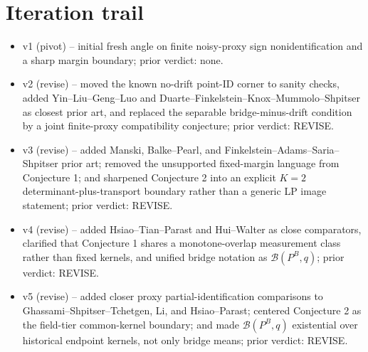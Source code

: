 \documentclass[11pt]{article}
\theoremstyle{definition}
\theoremstyle{plain}
\theoremstyle{remark}
\begin{document}
\section{Iteration trail}
\begin{itemize}[leftmargin=*]
\item v1 (pivot) -- initial fresh angle on finite noisy-proxy sign nonidentification and a sharp margin boundary; prior verdict: none.
\item v2 (revise) -- moved the known no-drift point-ID corner to sanity checks, added Yin--Liu--Geng--Luo and Duarte--Finkelstein--Knox--Mummolo--Shpitser as closest prior art, and replaced the separable bridge-minus-drift condition by a joint finite-proxy compatibility conjecture; prior verdict: REVISE.
\item v3 (revise) -- added Manski, Balke--Pearl, and Finkelstein--Adams--Saria--Shpitser prior art; removed the unsupported fixed-margin language from Conjecture 1; and sharpened Conjecture 2 into an explicit \(K=2\) determinant-plus-transport boundary rather than a generic LP image statement; prior verdict: REVISE.
\item v4 (revise) -- added Hsiao--Tian--Parast and Hui--Walter as close comparators, clarified that Conjecture 1 shares a monotone-overlap measurement class rather than fixed kernels, and unified bridge notation as \(\mathcal{B}(P^B,q)\); prior verdict: REVISE.
\item v5 (revise) -- added closer proxy partial-identification comparisons to Ghassami--Shpitser--Tchetgen, Li, and Hsiao--Parast; centered Conjecture 2 as the field-tier common-kernel boundary; and made \(\mathcal{B}(P^B,q)\) existential over historical endpoint kernels, not only bridge means; prior verdict: REVISE.
\end{itemize}
\end{document}
